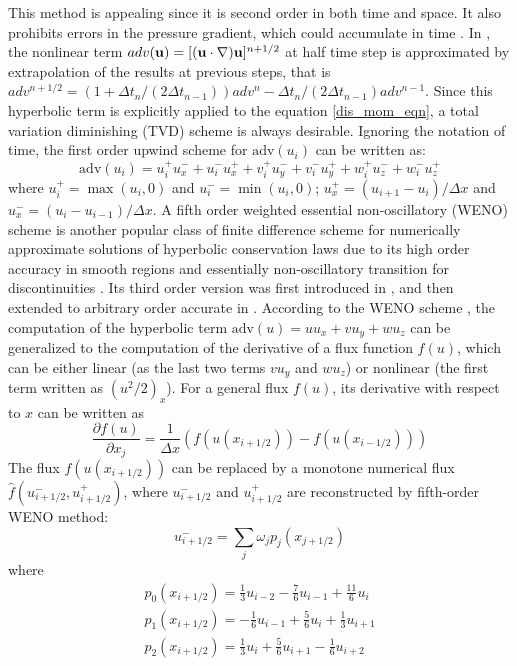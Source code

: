 This method is appealing since it is second order in both time and space. It also prohibits errors in the pressure gradient, which could accumulate in time \cite{Guermond2006Overview}. In , the nonlinear term $adv(\mathbf{u}) = [(\mathbf{u}\cdot\nabla)\mathbf{u}]^{n+1/2}$ at half time step is approximated by extrapolation of the results at previous steps, that is $adv^{n+1/2} = (1+\Delta t_n/(2\Delta t_{n-1}))adv^{n} -\Delta t_n/(2\Delta t_{n-1})adv^{n-1}$. Since this hyperbolic term is explicitly applied to the equation \ref{dis_mom_eqn}, a total variation diminishing (TVD) scheme \cite{harten1983high} is always desirable. Ignoring the notation of time, the first order upwind scheme for $\text{adv}(u_i)$ can be written as:
\begin{equation}
\text{adv}(u_i) = u_i^+ u_x^- + u_i^- u_x^+ 
	  + v_i^+ u_y^- + v_i^- u_y^+
	  + w_i^+ u_z^- + w_i^- u_z^+
\label{upwind_adv}
\end{equation}
where $u_i^+ = \max(u_i, 0)$ and $u_i^- = \min(u_i, 0)$; $u_x^+ = (u_{i+1}-u_{i})/\Delta x$ and $u_x^- = (u_i - u_{i-1})/\Delta x$.
A fifth order weighted essential non-oscillatory (WENO) scheme is another popular class of finite difference scheme for numerically approximate solutions of hyperbolic conservation laws due to its high order accuracy in smooth regions and essentially non-oscillatory transition for discontinuities \cite{jiang1999high}. Its third order version was first introduced in \cite{Liu1994Weighted}, and then extended to arbitrary order accurate in \cite{Jiang1996Efficient}. According to the WENO scheme \cite{Jiang1996Efficient}, the computation of the hyperbolic term $\text{adv}(u) = uu_x + vu_y + wu_z$ can be generalized to the computation of the derivative of a flux function $f(u)$, which can be either linear (as the last two terms 
$vu_y$ and $wu_z$) or nonlinear (the first term written as $(u^2/2)_x$).
For a general flux $f(u)$, its derivative with respect to $x$ can be written as 
\begin{equation}
\frac{\partial f(u)}{\partial x_j} = \frac{1}{\Delta x}(f(u(x_{i+1/2})) - f(u(x_{i-1/2})))
\end{equation}
The flux $f(u(x_{i+1/2}))$ can be replaced by a monotone numerical flux $\hat{f}(u^-_{i+1/2}, u^+_{i+1/2})$, where $u^-_{i+1/2}$ and $u^+_{i+1/2}$ are reconstructed by fifth-order WENO method:
\begin{equation}
u^-_{i+1/2} = \sum_j\omega_jp_j(x_{j+1/2})
\end{equation}
where
\begin{eqnarray}
p_0(x_{i+1/2}) = \frac{1}{3}u_{i-2} - \frac{7}{6}u_{i-1} + \frac{11}{6}u_{i}\\
p_1(x_{i+1/2}) = -\frac{1}{6}u_{i-1} + \frac{5}{6}u_i + \frac{1}{3}u_{i+1}\\
p_2(x_{i+1/2}) = \frac{1}{3}u_i + \frac{5}{6}u_{i+1} - \frac{1}{6}u_{i+2}
\end{eqnarray}

